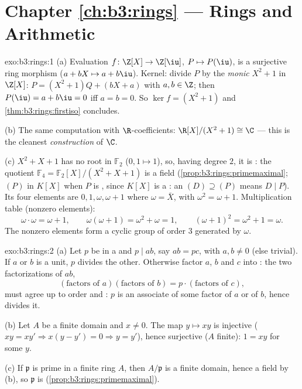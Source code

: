 \section*{Chapter \ref{ch:b3:rings} --- Rings and Arithmetic}

\begin{solution}{exo:b3:rings:1}
(a) Evaluation $f \colon \Z[X] \to \Z[\iu]$, $P \mapsto P(\iu)$,
is a surjective ring morphism ($a + bX \mapsto a + b\iu$). Kernel:
divide $P$ by the \emph{monic} $X^2 + 1$ in $\Z[X]$: $P = (X^2 +
1)Q + (bX + a)$ with $a, b \in \Z$; then $P(\iu) = a + b\iu = 0$
iff $a = b = 0$. So $\ker f = (X^2+1)$ and
\cref{thm:b3:rings:firstiso} concludes.

(b) The same computation with $\R$-coefficients: $\R[X]/(X^2+1)
\cong \C$ --- this is the cleanest \emph{construction} of $\C$.

(c) $X^2 + X + 1$ has no root in $\mathbb F_2$ ($0, 1 \mapsto 1$),
so, having degree $2$, it is : the quotient $\mathbb
F_4 = \mathbb F_2[X]/(X^2+X+1)$ is a field
(\cref{prop:b3:rings:primemaximal}; $(P)$  in $K[X]$ when
$P$ is , since $K[X]$ is a : an  $(D) \supseteq
(P)$ means $D \mid P$). Its four elements are $0, 1, \omega,
\omega + 1$ where $\omega = \bar X$, with $\omega^2 = \omega + 1$.
Multiplication table (nonzero elements):
\[
\omega \cdot \omega = \omega + 1, \qquad
\omega(\omega + 1) = \omega^2 + \omega = 1, \qquad
(\omega+1)^2 = \omega^2 + 1 = \omega .
\]
The nonzero elements form a cyclic group of order $3$ generated by
$\omega$.
\end{solution}

\begin{solution}{exo:b3:rings:2}
(a) Let $p$ be  in a  and $p \mid ab$, say $ab =
pc$, with $a, b \neq 0$ (else trivial). If $a$ or $b$ is a unit,
$p$ divides the other. Otherwise factor $a$, $b$ and $c$ into
: the two factorizations of $ab$,
\[
(\text{factors of } a)(\text{factors of } b) = p \cdot
(\text{factors of } c),
\]
must agree up to order and : $p$ is an associate of some
 factor of $a$ or of $b$, hence divides it.

(b) Let $A$ be a finite domain and $x \neq 0$. The map $y \mapsto
xy$ is injective ($xy = xy' \Rightarrow x(y - y') = 0 \Rightarrow
y = y'$), hence surjective ($A$ finite): $1 = xy$ for some $y$.

(c) If $\mathfrak p$ is prime in a finite ring $A$, then
$A/\mathfrak p$ is a finite domain, hence a field by (b), so
$\mathfrak p$ is  (\cref{prop:b3:rings:primemaximal}).
\end{solution}

